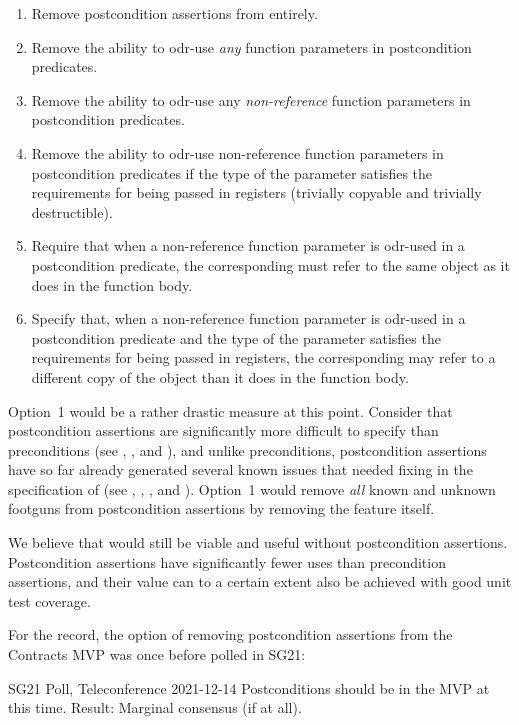 \begin{enumerate}
\item Remove postcondition assertions from \cite{P2900R10} entirely.
\item Remove the ability to odr-use \emph{any} function parameters in postcondition predicates.
\item Remove the ability to odr-use any \emph{non-reference} function parameters in postcondition predicates.
\item Remove the ability to odr-use non-reference function parameters in postcondition predicates if the type of the parameter satisfies the requirements for being passed in registers (trivially copyable and trivially destructible).
\item Require that when a non-reference function parameter is odr-used in a postcondition predicate, the corresponding  must refer to the same object as it does in the function body.
\item Specify that, when a non-reference function parameter is odr-used in a postcondition predicate and the type of the parameter satisfies the requirements for being passed in registers, the corresponding  may refer to a different copy of the object than it does in the function body.
\end{enumerate}

Option~1 would be a rather drastic measure at this point. Consider that postcondition assertions are significantly more difficult to specify than preconditions (see \cite{P1323R2}, \cite{P3007R0}, and \cite{P3098R0}), and unlike preconditions, postcondition assertions have so far already generated several known issues that needed fixing in the specification of \cite{P2900R10} (see \cite{P3387R0}, \cite{P3460R0}, \cite{D3483R0}, and \cite{D3484R0}). Option~1 would remove \emph{all} known and unknown footguns from postcondition assertions by removing the feature itself.

We believe that \cite{P2900R10} would still be viable and useful without postcondition assertions. Postcondition assertions have significantly fewer uses than precondition assertions, and their value can to a certain extent also be achieved with good unit test coverage. 

For the record, the option of removing postcondition assertions from the Contracts MVP was once before polled in SG21:

\begin{wgpoll}{SG21 Poll, Teleconference 2021-12-14}
Postconditions should be in the MVP at this time.
Result: Marginal consensus (if at all).
\end{wgpoll}

